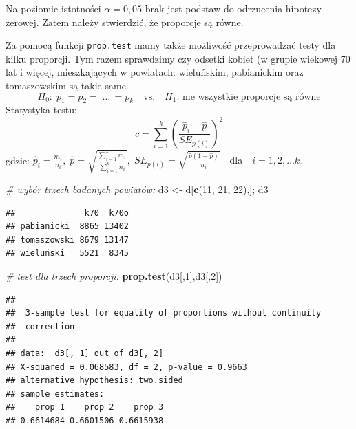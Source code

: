 \documentclass[polish,]{book}
\newenvironment{Shaded}{\begin{snugshade}}{\end{snugshade}}
\newcommand{\CommentTok}[1]{\textcolor[rgb]{0.56,0.35,0.01}{\textit{#1}}}
\newcommand{\DecValTok}[1]{\textcolor[rgb]{0.00,0.00,0.81}{#1}}
\newcommand{\KeywordTok}[1]{\textcolor[rgb]{0.13,0.29,0.53}{\textbf{#1}}}
\newcommand{\NormalTok}[1]{#1}
\newcommand{\StringTok}[1]{\textcolor[rgb]{0.31,0.60,0.02}{#1}}
\begin{document}
Na poziomie istotności \(\alpha = 0,05\) brak jest podstaw do odrzucenia hipotezy zerowej. Zatem należy stwierdzić, że proporcje są równe.

Za pomocą funkcji \href{https://rdrr.io/r/stats/prop.test.html}{\texttt{prop.test}} mamy także możliwość przeprowadzać
testy dla kilku proporcji. Tym razem sprawdzimy czy odsetki kobiet (w grupie wiekowej 70 lat i więcej, mieszkających w powiatach: wieluńskim, pabianickim oraz
tomaszowskim są takie same.
\[
H_{0}:\;p_1=p_2=\;\dots\,=p_k\quad\mbox{vs.}\quad H_{1}:\,\mbox{nie wszystkie proporcje są równe}
\]
Statystyka testu:
\begin{equation}
c=\sum_{i=1}^{k}\left(\frac{\hat{p}_i-\hat{p}}{SE_{p(i)}}\right)^2
\label{eq:wz1168}
\end{equation}
gdzie: \(\hat{p}_i=\frac{m_i}{n_i},\;\hat{p}=\sqrt{\frac{\sum_{i=1}^{k}m_i}{\sum_{i=1}^{k}n_i}},\;SE_{p(i)}=\sqrt{\frac{\hat{p}(1-\hat{p})}{n_i}} \quad\mbox{dla}\quad i=1,2,\dots k\).

\begin{Shaded}
\begin{Highlighting}[]
\CommentTok{# wybór trzech badanych powiatów:}
\NormalTok{d3 <-}\StringTok{ }\NormalTok{d[}\KeywordTok{c}\NormalTok{(}\DecValTok{11}\NormalTok{, }\DecValTok{21}\NormalTok{, }\DecValTok{22}\NormalTok{),]; d3}
\end{Highlighting}
\end{Shaded}

\begin{verbatim}
##              k70  k70o
## pabianicki  8865 13402
## tomaszowski 8679 13147
## wieluński   5521  8345
\end{verbatim}

\begin{Shaded}
\begin{Highlighting}[]
\CommentTok{# test dla trzech proporcji:}
\KeywordTok{prop.test}\NormalTok{(d3[,}\DecValTok{1}\NormalTok{],d3[,}\DecValTok{2}\NormalTok{])}
\end{Highlighting}
\end{Shaded}

\begin{verbatim}
## 
##  3-sample test for equality of proportions without continuity
##  correction
## 
## data:  d3[, 1] out of d3[, 2]
## X-squared = 0.068583, df = 2, p-value = 0.9663
## alternative hypothesis: two.sided
## sample estimates:
##    prop 1    prop 2    prop 3 
## 0.6614684 0.6601506 0.6615938
\end{verbatim}
\end{document}
